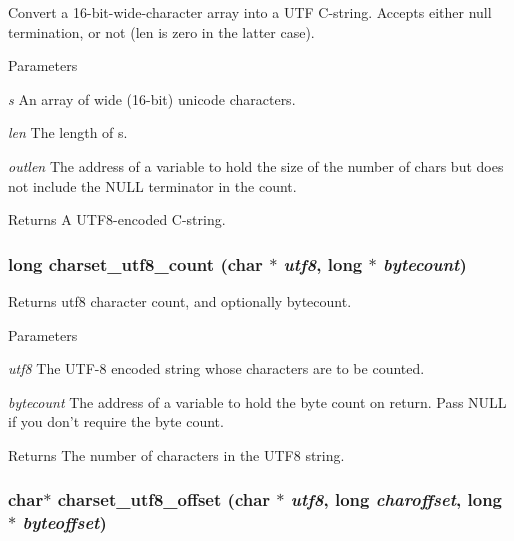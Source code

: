 Convert a 16-\/bit-\/wide-\/character array into a UTF C-\/string. Accepts either null termination, or not (len is zero in the latter case).


\begin{DoxyParams}{Parameters}
\item[{\em s}]An array of wide (16-\/bit) unicode characters. \item[{\em len}]The length of s. \item[{\em outlen}]The address of a variable to hold the size of the number of chars but does not include the NULL terminator in the count. \end{DoxyParams}
\begin{DoxyReturn}{Returns}
A UTF8-\/encoded C-\/string. 
\end{DoxyReturn}
\hypertarget{group__unicode_ga94f22fadc5fbc03f9153099ecbc0470e}{
\subsubsection[{charset\_\-utf8\_\-count}]{\setlength{\rightskip}{0pt plus 5cm}long charset\_\-utf8\_\-count (char $\ast$ {\em utf8}, \/  long $\ast$ {\em bytecount})}}
\label{group__unicode_ga94f22fadc5fbc03f9153099ecbc0470e}


Returns utf8 character count, and optionally bytecount. 
\begin{DoxyParams}{Parameters}
\item[{\em utf8}]The UTF-\/8 encoded string whose characters are to be counted. \item[{\em bytecount}]The address of a variable to hold the byte count on return. Pass NULL if you don't require the byte count. \end{DoxyParams}
\begin{DoxyReturn}{Returns}
The number of characters in the UTF8 string. 
\end{DoxyReturn}
\hypertarget{group__unicode_ga2c03ff86b04bcf33c0ba0915a9e1c1da}{
\subsubsection[{charset\_\-utf8\_\-offset}]{\setlength{\rightskip}{0pt plus 5cm}char$\ast$ charset\_\-utf8\_\-offset (char $\ast$ {\em utf8}, \/  long {\em charoffset}, \/  long $\ast$ {\em byteoffset})}}
\label{group__unicode_ga2c03ff86b04bcf33c0ba0915a9e1c1da}


